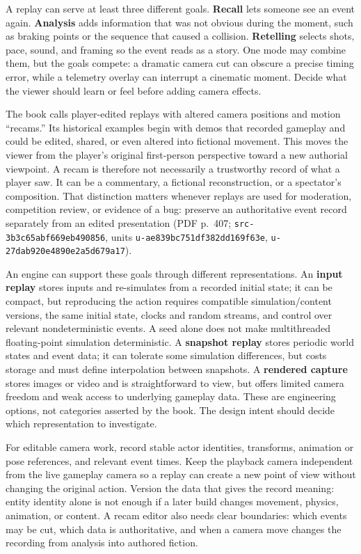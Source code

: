 A replay can serve at least three different goals. \textbf{Recall} lets someone see an event again. \textbf{Analysis} adds information that was not obvious during the moment, such as braking points or the sequence that caused a collision. \textbf{Retelling} selects shots, pace, sound, and framing so the event reads as a story. One mode may combine them, but the goals compete: a dramatic camera cut can obscure a precise timing error, while a telemetry overlay can interrupt a cinematic moment. Decide what the viewer should learn or feel before adding camera effects.

The book calls player-edited replays with altered camera positions and motion ``recams.'' Its historical examples begin with demos that recorded gameplay and could be edited, shared, or even altered into fictional movement. This moves the viewer from the player's original first-person perspective toward a new authorial viewpoint. A recam is therefore not necessarily a trustworthy record of what a player saw. It can be a commentary, a fictional reconstruction, or a spectator's composition. That distinction matters whenever replays are used for moderation, competition review, or evidence of a bug: preserve an authoritative event record separately from an edited presentation (PDF p.~407; \texttt{src-3b3c65abf669eb490856}, units \texttt{u-ae839bc751df382dd169f63e}, \texttt{u-27dab920e4890e2a5d679a17}).

An engine can support these goals through different representations. An \textbf{input replay} stores inputs and re-simulates from a recorded initial state; it can be compact, but reproducing the action requires compatible simulation/content versions, the same initial state, clocks and random streams, and control over relevant nondeterministic events. A seed alone does not make multithreaded floating-point simulation deterministic. A \textbf{snapshot replay} stores periodic world states and event data; it can tolerate some simulation differences, but costs storage and must define interpolation between snapshots. A \textbf{rendered capture} stores images or video and is straightforward to view, but offers limited camera freedom and weak access to underlying gameplay data. These are engineering options, not categories asserted by the book. The design intent should decide which representation to investigate.

For editable camera work, record stable actor identities, transforms, animation or pose references, and relevant event times. Keep the playback camera independent from the live gameplay camera so a replay can create a new point of view without changing the original action. Version the data that gives the record meaning: entity identity alone is not enough if a later build changes movement, physics, animation, or content. A recam editor also needs clear boundaries: which events may be cut, which data is authoritative, and when a camera move changes the recording from analysis into authored fiction.

